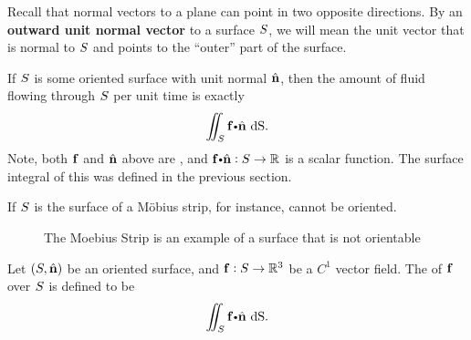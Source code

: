 Recall that normal vectors to a plane can point in two opposite directions. By an
\textbf{outward unit normal vector} to a surface $S$, we will mean the unit vector that is normal to $S$ and
points to the ``outer'' part of the surface.


  If $S$ is some oriented surface with unit normal $\hat{ \mathbf{ n}}$, then the amount of fluid flowing through $S$ per unit time is exactly
  \begin{equation*}
    \diint_\superficie \vector{f} \bp \hat{ \vector{n}} \,  \d \S.
  \end{equation*}
  Note, both $\mathbf{ f}$ and $\hat{ \mathbf{ n}}$ above are , and $\vector{f} \bp \hat{ \vector{n}}: \superficie \to \bbR$ is a scalar function.
  The surface integral of this was defined in the previous section.




  \begin{exa}
    If $S$ is the surface of a M\"obius strip, for instance, cannot be oriented.
  \end{exa}

  \begin{figure}[h!]
  \centering
\caption{The Moebius Strip is an example of a surface that is not orientable}
  \end{figure}










  \begin{definition}
    Let $(S, \hat{ \mathbf{ n}})$ be an oriented surface, and $\mathbf{ f}:S \to \mathbb{R}^3$ be a $C^1$ vector field.
    The  of $\mathbf{ f}$ over $S$ is defined to be
    \begin{equation*}
      \diint_\superficie \vector{f} \bp \hat{ \vector{n}} \,  \d \S.
    \end{equation*}
  \end{definition}

